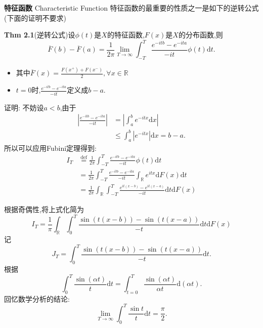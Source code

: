 \begin{frame}{\textbf{特征函数} Characteristic Function}
	特征函数的最重要的性质之一是如下的逆转公式(下面的证明不要求)
	\begin{block}{\textbf{Thm 2.1}(逆转公式)设$\phi(t)$是$X$的特征函数,$F(x)$是$X$的分布函数,则}
		\begin{equation}
			\overline{F}(b)-\overline{F}(a) = \frac{1}{2\pi}\lim_{T\to\infty}\int_{-T}^{T}\frac{e^{-itb}-e^{-ita}}{-it}\phi(t)\mathrm{d}t.
		\end{equation}
		\begin{itemize}
			\item 其中$\overline{F}(x) = \frac{F(x^+)+F(x^-)}{2},\forall x\in \mathbb{R}$
			\item $t=0$时,$\frac{e^{-itb}-e^{-ita}}{-it}$定义成$b-a$.
		\end{itemize}
	\end{block}
\end{frame}

\begin{frame}
	证明: 不妨设$a<b$,由于\begin{equation}
		\begin{split}
			\left|\frac{e^{-itb}-e^{-ita}}{-it} \right| &= \left|\int_{a}^{b}e^{-itx}\mathrm{d}x\right| \\
			 &\leqslant \int_{a}^{b}\left|e^{-itx}\right|\mathrm{d}x = b-a.
		\end{split}
		\end{equation}
		所以可以应用Fubini定理得到:
		\begin{equation}
		\begin{split}
			I_T &\stackrel{\text{def}}{=}\frac{1}{2\pi}\int_{-T}^{T}\frac{e^{-itb}-e^{-ita}}{-it}\phi(t)\mathrm{d}t \\
			&= \frac{1}{2\pi}\int_{-T}^{T}\frac{e^{-itb}-e^{-ita}}{-it}\int_{\mathbb{R}}e^{itx}\mathrm{d}F(x)\mathrm{d}t \\
			&=\frac{1}{2\pi}\int_{\mathbb{R}}\int_{-T}^{T}\frac{e^{it(x-b)}-e^{it(x-a)}}{-it}\mathrm{d}t\mathrm{d}F(x)
		\end{split}
		\end{equation}
\end{frame}

\begin{frame}
	根据奇偶性,将上式化简为
	\begin{equation}
		I_T=\frac{1}{\pi}\int_{\mathbb{R}}\int_{0}^{T}\frac{\sin(t(x-b))-\sin(t(x-a))}{-t}\mathrm{d}t\mathrm{d}F(x)
	\end{equation}
	记\begin{equation}
		J_T=\int_{0}^{T}\frac{\sin(t(x-b))-\sin(t(x-a))}{-t}\mathrm{d}t.
	\end{equation}
	根据\begin{equation}
		\int_{0}^{T}\frac{\sin(\alpha t)}{t}\mathrm{d}t = \int_{t=0}^{T}\frac{\sin(\alpha t)}{\alpha t}\mathrm{d}(\alpha t).
	\end{equation}
	回忆数学分析的结论:
	\begin{equation}
		\lim_{T\to\infty}\int_{0}^T\frac{\sin t}{t}\mathrm{d}t = \frac{\pi}{2}.
	\end{equation}
\end{frame}

